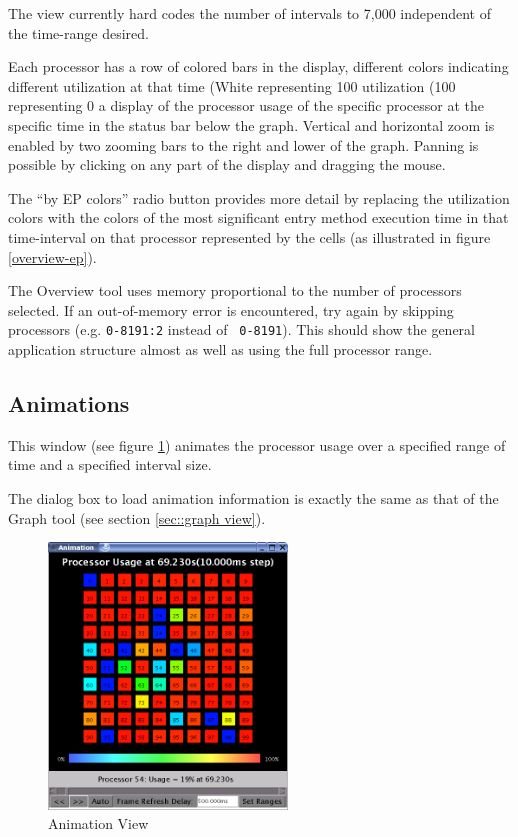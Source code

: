 \documentclass[10pt]{report}
\begin{document}
The view currently hard codes the number of intervals to 7,000
independent of the time-range desired.

Each processor has a row of colored bars in the display, different
colors indicating different utilization at that time (White
representing 100%
utilization (100%
representing 0%
a display of the processor usage of the specific processor at the
specific time in the status bar below the graph. Vertical and
horizontal zoom is enabled by two zooming bars to the right and lower
of the graph. Panning is possible by clicking on any part of the
display and dragging the mouse.

The ``by EP colors'' radio button provides more detail by replacing
the utilization colors with the colors of the most significant entry
method execution time in that time-interval on that processor
represented by the cells (as illustrated in figure
\ref{overview-ep}). 

The Overview tool uses memory proportional to the number of processors
selected. If an out-of-memory error is encountered, try again by
skipping processors (e.g. {\tt 0-8191:2} instead of {\tt
0-8191}). This should show the general application structure almost as
well as using the full processor range.

\subsection{Animations}

This window (see figure \ref{animation}) animates the processor usage
over a specified range of time and a specified interval size.

The dialog box to load animation information is exactly the same as
that of the Graph tool (see section \ref{sec::graph view}).

\begin{figure}[htb]
\center
\includegraphics[width=2.5in]{fig/animation}
\caption{Animation View}
\label{animation}
\end{figure}
\end{document}
